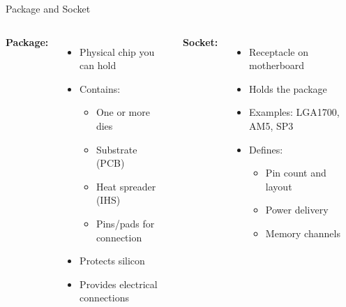 \documentclass[aspectratio=169,12pt]{beamer}
\begin{document}
\begin{frame}{Package and Socket}
\begin{columns}[T]
\textbf{Package:}
\begin{itemize}
\item Physical chip you can hold
\item Contains:
  \begin{itemize}
  \item One or more dies
  \item Substrate (PCB)
  \item Heat spreader (IHS)
  \item Pins/pads for connection
  \end{itemize}
\item Protects silicon
\item Provides electrical connections
\end{itemize}

\vspace{0.3cm}
\textbf{Socket:}
\begin{itemize}
\item Receptacle on motherboard
\item Holds the package
\item Examples: LGA1700, AM5, SP3
\item Defines:
  \begin{itemize}
  \item Pin count and layout
  \item Power delivery
  \item Memory channels
  \end{itemize}
\end{itemize}

\begin{center}
\end{center}
\end{columns}
\end{frame}
\end{document}

